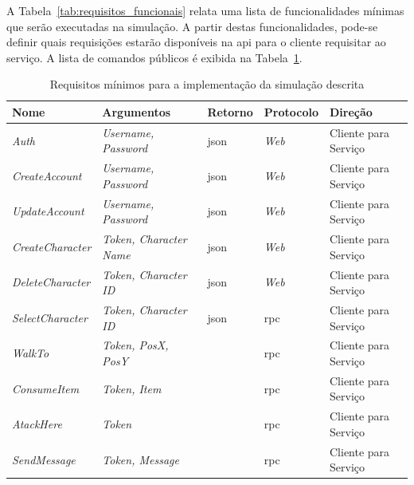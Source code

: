 \begin{table}[htb!]
\begin{adjustbox}{max width=\textwidth}
\begin{tabular}{|l|l|l|}
\end{tabular}
\end{adjustbox}
\end{table}

A Tabela~\ref{tab:requisitos_funcionais} relata uma lista de funcionalidades mínimas que serão executadas na simulação.
%
A partir destas funcionalidades, pode-se definir quais requisições estarão disponíveis na \ac{api} para o cliente requisitar ao serviço.
%
A lista de comandos públicos é exibida na Tabela~\ref{tab:api_publica}.


\begin{table}[htb!]
\centering
\begin{adjustbox}{max width=\textwidth}
\caption{Requisitos mínimos para a implementação da simulação descrita}
\label{tab:api_publica}
\begin{tabular}{|l|l|l|l|l|}
\hline
Nome                  & Argumentos            & Retorno & Protocolo & Direção              \\ \hline
\textit{Auth}                  & \textit{Username, Password}    & \ac{json} & \textit{Web}       & Cliente para Serviço \\ \hline
\textit{CreateAccount}         & \textit{Username, Password}    & \ac{json} & \textit{Web}       & Cliente para Serviço \\ \hline
\textit{UpdateAccount}         & \textit{Username, Password}    & \ac{json} & \textit{Web}       & Cliente para Serviço \\ \hline
\textit{CreateCharacter}       & \textit{Token, Character Name} & \ac{json} & \textit{Web}       & Cliente para Serviço \\ \hline
\textit{DeleteCharacter}       & \textit{Token, Character ID}   & \ac{json} & \textit{Web}       & Cliente para Serviço \\ \hline
\textit{SelectCharacter}       & \textit{Token, Character ID}   & \ac{json} & \ac{rpc}           & Cliente para Serviço \\ \hline
\textit{WalkTo}                & \textit{Token, PosX, PosY}     &           & \ac{rpc}           & Cliente para Serviço \\ \hline
\textit{ConsumeItem}           & \textit{Token, Item}           &           & \ac{rpc}           & Cliente para Serviço \\ \hline
\textit{AtackHere}             & \textit{Token}                 &           & \ac{rpc}           & Cliente para Serviço \\ \hline
\textit{SendMessage}           & \textit{Token, Message}        &           & \ac{rpc}           & Cliente para Serviço \\ \hline

\end{tabular}
\end{adjustbox}
\end{table}
